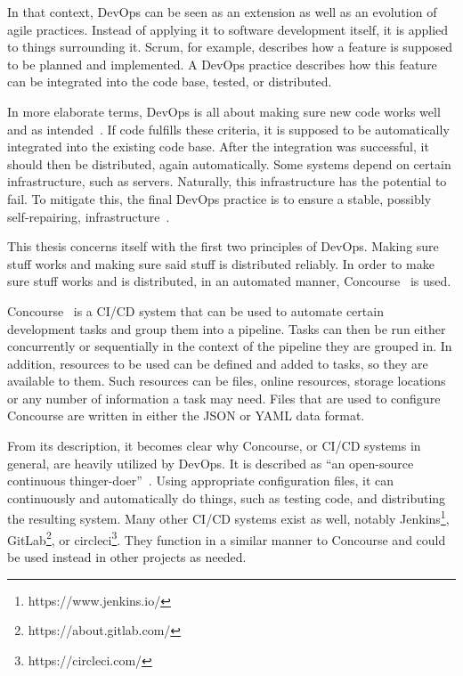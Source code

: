 In that context, DevOps can be seen as an extension as well as an evolution of agile practices.
Instead of applying it to software development itself, it is applied to things surrounding it.
Scrum, for example, describes how a feature is supposed to be planned and implemented.
A DevOps practice describes how this feature can be integrated into the code base, tested, or distributed.

In more elaborate terms, DevOps is all about making sure new code works well and as intended~\cite{the-software-architext-and-devops}.
If code fulfills these criteria, it is supposed to be automatically integrated into the existing code base.
After the integration was successful, it should then be distributed, again automatically.
Some systems depend on certain infrastructure, such as servers.
Naturally, this infrastructure has the potential to fail.
To mitigate this, the final DevOps practice is to ensure a stable, possibly self-repairing, infrastructure~\cite{container-and-microservice-driven-design-for-cloud-infrastructure-devops}.

This thesis concerns itself with the first two principles of DevOps.
Making sure stuff works and making sure said stuff is distributed reliably.
In order to make sure stuff works and is distributed, in an automated manner, Concourse~\cite{concourse} is used.

Concourse~\cite{concourse} is a CI/CD system that can be used to automate certain development tasks and group them into a pipeline.
Tasks can then be run either concurrently or sequentially in the context of the pipeline they are grouped in.
In addition, resources to be used can be defined and added to tasks, so they are available to them.
Such resources can be files, online resources, storage locations or any number of information a task may need.
Files that are used to configure Concourse are written in either the JSON or YAML data format.

\pagebreak

From its description, it becomes clear why Concourse, or CI/CD systems in general, are heavily utilized by DevOps.
It is described as ``an open-source continuous thinger-doer''~\cite{concourse}.
Using appropriate configuration files, it can continuously and automatically do things, such as testing code, and distributing the resulting system.
Many other CI/CD systems exist as well, notably Jenkins\footnote{https://www.jenkins.io/}, GitLab\footnote{https://about.gitlab.com/}, or circleci\footnote{https://circleci.com/}.
They function in a similar manner to Concourse and could be used instead in other projects as needed.

